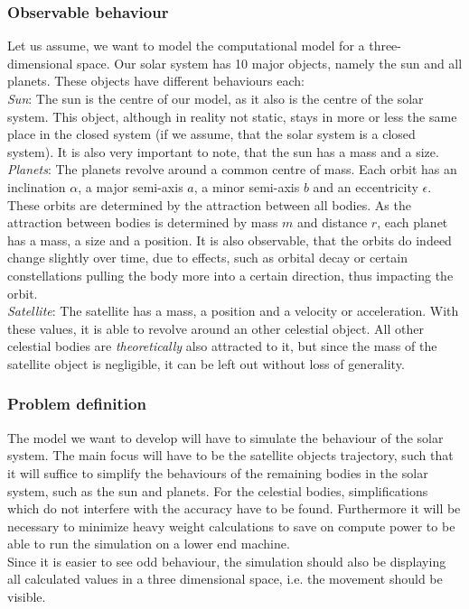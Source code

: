 \documentclass[conference,compsoc]{IEEEtran}
\begin{document}
\subsubsection{Observable behaviour}
\label{observations}
Let us assume, we want to model the computational model for a three-dimensional space. Our solar system has 10 major objects, namely the sun and all planets. These objects have different behaviours each:\\
\emph{Sun}: The sun is the centre of our model, as it also is the centre of the solar system. This object, although in reality not static, stays in more or less the same place in the closed system (if we assume, that the solar system is a closed system). It is also very important to note, that the sun has a mass and a size.\\
\emph{Planets}: The planets revolve around a common centre of mass. Each orbit has an inclination $\alpha$, a major semi-axis $a$, a minor semi-axis $b$ and an eccentricity $\epsilon$. 
These orbits are determined by the attraction between all bodies. As the attraction between bodies is determined by mass $m$ and distance $r$, each planet has a mass, a size and a position. It is also observable, that the orbits do indeed change slightly over time, due to effects, such as orbital decay or certain constellations pulling the body more into a certain direction, thus impacting the orbit.\\
\emph{Satellite}: The satellite has a mass, a position and a velocity or acceleration. With these values, it is able to revolve around an other celestial object. All other celestial bodies are \emph{theoretically} also attracted to it, but since the mass of the satellite object is negligible, it can be left out without loss of generality.
\subsubsection{Problem definition}
\label{Problem-Def}
The model we want to develop will have to simulate the behaviour of the solar system. The main focus will have to be the satellite objects trajectory, such that it will suffice to simplify the behaviours of the remaining bodies in the solar system, such as the sun and planets. For the celestial bodies, simplifications which do not interfere with the accuracy have to be found. Furthermore it will be necessary to minimize heavy weight calculations to save on compute power to be able to run the simulation on a lower end machine. \\
Since it is easier to see odd behaviour, the simulation should also be displaying all calculated values in a three dimensional space, i.e. the movement should be visible.
\end{document}
